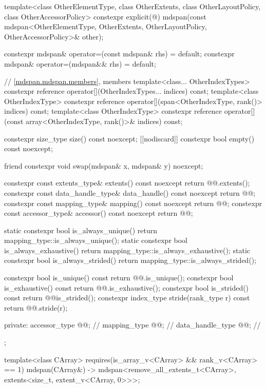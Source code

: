 \begin{codeblock}
{{    template<class OtherElementType, class OtherExtents,
             class OtherLayoutPolicy, class OtherAccessorPolicy>
      constexpr explicit(@\seebelow@)
        mdspan(const mdspan<OtherElementType, OtherExtents,
                            OtherLayoutPolicy, OtherAccessorPolicy>& other);

    constexpr mdspan& operator=(const mdspan& rhs) = default;
    constexpr mdspan& operator=(mdspan&& rhs) = default;

    // \ref{mdspan.mdspan.members}, members
    template<class... OtherIndexTypes>
      constexpr reference operator[](OtherIndexTypes... indices) const;
    template<class OtherIndexType>
      constexpr reference operator[](span<OtherIndexType, rank()> indices) const;
    template<class OtherIndexType>
      constexpr reference operator[](const array<OtherIndexType, rank()>& indices) const;

    constexpr size_type size() const noexcept;
    [[nodiscard]] constexpr bool empty() const noexcept;

    friend constexpr void swap(mdspan& x, mdspan& y) noexcept;

    constexpr const extents_type& extents() const noexcept { return @@.extents(); }
    constexpr const data_handle_type& data_handle() const noexcept { return @@; }
    constexpr const mapping_type& mapping() const noexcept { return @@; }
    constexpr const accessor_type& accessor() const noexcept { return @@; }

    static constexpr bool is_always_unique()
      { return mapping_type::is_always_unique(); }
    static constexpr bool is_always_exhaustive()
      { return mapping_type::is_always_exhaustive(); }
    static constexpr bool is_always_strided()
      { return mapping_type::is_always_strided(); }

    constexpr bool is_unique() const
      { return @@.is_unique(); }
    constexpr bool is_exhaustive() const
      { return @@.is_exhaustive(); }
    constexpr bool is_strided() const
      { return @@is_strided(); }
    constexpr index_type stride(rank_type r) const
      { return @@.stride(r); }

  private:
    accessor_type @@;         // \expos
    mapping_type @@;          // \expos
    data_handle_type @@;      // \expos
  };

  template<class CArray>
    requires(is_array_v<CArray> && rank_v<CArray> == 1)
    mdspan(CArray&)
      -> mdspan<remove_all_extents_t<CArray>, extents<size_t, extent_v<CArray, 0>>>;

}
\end{codeblock}
